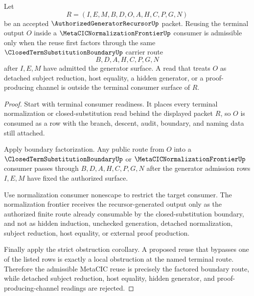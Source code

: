 \begin{lemma}
\label{lem:authorized-generator-recursor-terminal-output-metacic-reuse-boundary}
Let
$$
R=(I,E,M,B,D,O,A,H,C,P,G,N)
$$
be an accepted $\AuthorizedGeneratorRecursorUp$ packet. Reusing the terminal output $O$ inside a $\MetaCICNormalizationFrontierUp$ consumer is admissible only when the reuse first factors through the same $\ClosedTermSubstitutionBoundaryUp$ carrier route
$$
B,D,A,H,C,P,G,N
$$
after $I,E,M$ have admitted the generator surface. A read that treats $O$ as detached subject reduction, host equality, a hidden generator, or a proof-producing channel is outside the terminal consumer surface of $R$.
\end{lemma}
\begin{proof}
Start with terminal consumer readiness. It places every terminal normalization or closed-substitution read behind the displayed packet $R$, so $O$ is consumed as a row with the branch, descent, audit, boundary, and naming data still attached.

Apply boundary factorization. Any public route from $O$ into a $\ClosedTermSubstitutionBoundaryUp$ or $\MetaCICNormalizationFrontierUp$ consumer passes through $B,D,A,H,C,P,G,N$ after the generator admission rows $I,E,M$ have fixed the authorized surface.

Use normalization consumer nonescape to restrict the target consumer. The normalization frontier receives the recursor-generated output only as the authorized finite route already consumable by the closed-substitution boundary, and not as hidden induction, unchecked generation, detached normalization, subject reduction, host equality, or external proof production.

Finally apply the strict obstruction corollary. A proposed reuse that bypasses one of the listed rows is exactly a local obstruction at the named terminal route. Therefore the admissible MetaCIC reuse is precisely the factored boundary route, while detached subject reduction, host equality, hidden generator, and proof-producing-channel readings are rejected.
\end{proof}
